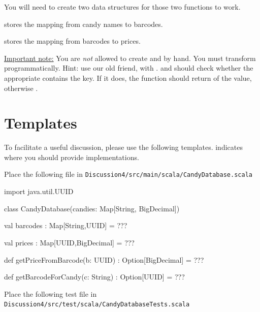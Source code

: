 \documentclass[9pt]{extbook}
\begin{document}
You will need to create two  data structures for those two functions to work.

 stores the mapping from candy names to barcodes.

 stores the mapping from barcodes to prices.

\underline{Important note:} You are \emph{not} allowed to create  and  by hand.  You must transform  programmatically.  Hint: use our old friend,  with .   and  should check whether the appropriate  contains the key.  If it does, the function should return  of the value, otherwise .

\section{Templates}

To facilitate a useful discussion, please use the following templates.   indicates where you should provide implementations.

Place the following file in \texttt{Discussion4/src/main/scala/CandyDatabase.scala}

\begin{scalacode}
import java.util.UUID

class CandyDatabase(candies: Map[String, BigDecimal]) {
  val barcodes : Map[String,UUID] = ???

  val prices : Map[UUID,BigDecimal] = ???

  def getPriceFromBarcode(b: UUID) : Option[BigDecimal] = ???

  def getBarcodeForCandy(c: String) : Option[UUID] = ???
}
\end{scalacode}

Place the following test file in \texttt{Discussion4/src/test/scala/CandyDatabaseTests.scala}
\end{document}
